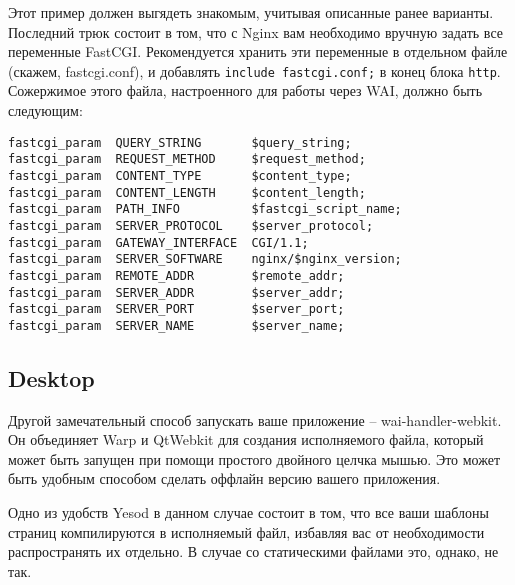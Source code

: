 Этот пример должен выгядеть знакомым, учитывая описанные ранее варианты. Последний трюк состоит в том, что с Nginx вам необходимо вручную задать все переменные FastCGI. Рекомендуется хранить эти переменные в отдельном файле (скажем, fastcgi.conf), и добавлять \lstinline{include fastcgi.conf;} в конец блока \lstinline{http}. Сожержимое этого файла, настроенного для работы через WAI, должно быть следующим:

\begin{lstlisting}
fastcgi_param  QUERY_STRING       $query_string;
fastcgi_param  REQUEST_METHOD     $request_method;
fastcgi_param  CONTENT_TYPE       $content_type;
fastcgi_param  CONTENT_LENGTH     $content_length;
fastcgi_param  PATH_INFO          $fastcgi_script_name;
fastcgi_param  SERVER_PROTOCOL    $server_protocol;
fastcgi_param  GATEWAY_INTERFACE  CGI/1.1;
fastcgi_param  SERVER_SOFTWARE    nginx/$nginx_version;
fastcgi_param  REMOTE_ADDR        $remote_addr;
fastcgi_param  SERVER_ADDR        $server_addr;
fastcgi_param  SERVER_PORT        $server_port;
fastcgi_param  SERVER_NAME        $server_name;
\end{lstlisting}
%
\subsection{Desktop} %
%

Другой замечательный способ запускать ваше приложение -- wai-handler-webkit. Он объединяет Warp и QtWebkit для создания исполняемого файла, который может быть запущен при помощи простого двойного целчка мышью. Это может быть удобным способом сделать оффлайн версию вашего приложения.
%

Одно из удобств Yesod в данном случае состоит в том, что все ваши шаблоны страниц компилируются в исполняемый файл, избавляя вас от необходимости распространять их отдельно. В случае со статическими файлами это, однако, не так.
%

